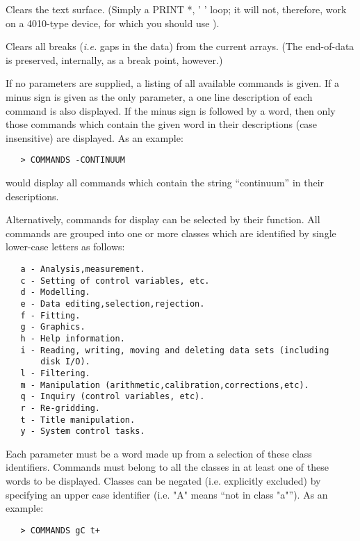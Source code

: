 \begin {description}
Clears the text surface. (Simply a PRINT *, ' ' loop; it will not,
therefore, work on a 4010-type device, for which you should use
). 

Clears all breaks ({\em i.e.} gaps in the data) from the current
arrays. (The end-of-data is preserved, internally, as a break point,
however.)

If no parameters are supplied, a listing of all available commands is
given. If a minus sign is given as the only parameter, a one line
description of each command is also displayed. If the minus sign is
followed by a word, then only those commands which contain the given
word in their descriptions (case insensitive) are displayed. As an example:

\begin{verbatim}
   > COMMANDS -CONTINUUM
\end{verbatim}

would display all commands which contain the string ``continuum'' in their
descriptions.

Alternatively, commands for display can be selected by their function.
All commands are grouped into one or more classes which are identified
by single lower-case letters as follows:

\begin{verbatim}
   a - Analysis,measurement.
   c - Setting of control variables, etc.
   d - Modelling.
   e - Data editing,selection,rejection.
   f - Fitting.
   g - Graphics.
   h - Help information.
   i - Reading, writing, moving and deleting data sets (including 
       disk I/O).
   l - Filtering.
   m - Manipulation (arithmetic,calibration,corrections,etc).
   q - Inquiry (control variables, etc).
   r - Re-gridding.
   t - Title manipulation.
   y - System control tasks.
\end{verbatim}

Each parameter must be a word made up from a selection of these class
identifiers. Commands must belong to all the classes in at least one of
these words to be displayed. Classes can be negated (i.e. explicitly
excluded) by specifying an upper case identifier (i.e. "A" means ``not
in class "a"''). As an example:

\begin{verbatim}
   > COMMANDS gC t+
\end{verbatim}


\end{description}
